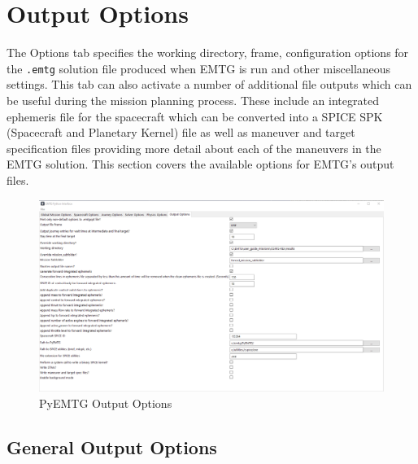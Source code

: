 \section{Output Options}
\label{sec:output_options}
The Options tab specifies the working directory, frame, configuration options for the \verb|.emtg| solution file produced when \ac{EMTG} is run and other miscellaneous settings. This tab can also activate a number of additional file outputs which can be useful during the mission planning process. These include an integrated ephemeris file for the spacecraft which can be converted into a \ac{SPICE} SPK (Spacecraft and Planetary Kernel) file as well as maneuver and target specification files providing more detail about each of the maneuvers in the \ac{EMTG} solution. This section covers the available options for \ac{EMTG}'s output files.

    \begin{figure}[H]
        \centering
        \includegraphics[width=0.95\linewidth]{../../shared_latex_inputs/images/pyemtg_output_options.png}
        \caption{PyEMTG Output Options}
    \end{figure}

\subsection{General Output Options}

